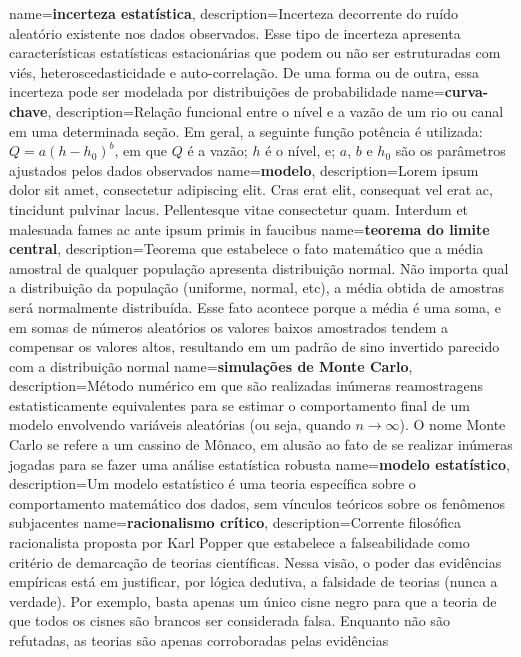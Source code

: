 {
    name=\textbf{incerteza estatística},
    description={Incerteza decorrente do ruído aleatório existente nos dados observados. Esse tipo de incerteza apresenta características estatísticas estacionárias que podem ou não ser estruturadas com viés, heteroscedasticidade e auto-correlação. De uma forma ou de outra, essa incerteza pode ser modelada por distribuições de probabilidade}
}
{
    name=\textbf{curva-chave},
    description={Relação funcional entre o nível e a vazão de um rio ou canal em uma determinada seção. Em geral, a seguinte função potência é utilizada: $Q = a(h - h_0)^b$, em que $Q$ é a vazão; $h$ é o nível, e; $a$, $b$ e $h_0$ são os parâmetros ajustados pelos dados observados}
}
{
    name=\textbf{modelo},
    description={Lorem ipsum dolor sit amet, consectetur adipiscing elit. Cras erat elit, consequat vel erat ac, tincidunt pulvinar lacus. Pellentesque vitae consectetur quam. Interdum et malesuada fames ac ante ipsum primis in faucibus}
}
{
    name=\textbf{teorema do limite central},
    description={Teorema que estabelece o fato matemático que a média amostral de qualquer população apresenta distribuição normal. Não importa qual a distribuição da população (uniforme, normal, etc), a média obtida de amostras será normalmente distribuída. Esse fato acontece porque a média é uma soma, e em somas de números aleatórios os valores baixos amostrados tendem a compensar os valores altos, resultando em um padrão de sino invertido parecido com a distribuição normal}
}
{
    name=\textbf{simulações de Monte Carlo},
    description={Método numérico em que são realizadas inúmeras reamostragens estatisticamente equivalentes para se estimar o comportamento final de um modelo envolvendo variáveis aleatórias (ou seja, quando $n \to \infty$). O nome Monte Carlo se refere a um cassino de Mônaco, em alusão ao fato de se realizar inúmeras jogadas para se fazer uma análise estatística robusta}
}
{
    name=\textbf{modelo estatístico},
    description={Um modelo estatístico é uma teoria específica sobre o comportamento matemático dos dados, sem vínculos teóricos sobre os fenômenos subjacentes}
}
{
    name=\textbf{racionalismo crítico},
    description={Corrente filosófica racionalista proposta por Karl Popper que estabelece a falseabilidade como critério de demarcação de teorias científicas. Nessa visão, o poder das evidências empíricas está em justificar, por lógica dedutiva, a falsidade de teorias (nunca a verdade). Por exemplo, basta apenas um único cisne negro para que a teoria de que todos os cisnes são brancos ser considerada falsa. Enquanto não são refutadas, as teorias são apenas corroboradas pelas evidências}
}
